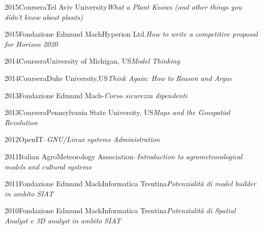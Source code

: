 \documentclass{curriculum}
\begin{document}
    \begin{entrylist}
    \entry
        {2015}{Coursera}{Tel Aviv University}{\emph{What a Plant Knows (and other things you didn’t know about plants)}}
    \end{entrylist}

    \begin{entrylist}
    \entry
        {2015}{Fondazione Edmund Mach}{Hyperion Ltd.}{\emph{How to write a competitive proposal for Horizon 2020}}
    \end{entrylist}
    
    \begin{entrylist}
    \entry
        {2014}{Coursera}{University of Michigan, US}{\emph{Model Thinking}}
    \end{entrylist}
    \begin{entrylist}
    \entry
        {2014}{Coursera}{Duke University,US}{\emph{Think Again: How to Reason and Argue}}
    \end{entrylist}
    
    \begin{entrylist}
    \entry
        {2013}{Fondazione Edmund Mach}{-}{\emph{Corso sicurezza dipendenti}}
    \end{entrylist}
    
    \begin{entrylist}
    \entry
        {2013}{Coursera}{Pennsylvania State University, US}{\emph{Maps and the Geospatial Revolution}}
    \end{entrylist}
    
    \begin{entrylist}
    \entry
        {2012}{OpenIT}{--}{\emph{GNU/Linux systems Administration}}
    \end{entrylist}
    
    \begin{entrylist}
    \entry
        {2011}{Italian AgroMeteorology Association}{--}{\emph{Introduction to agrometeorological models and cultural systems}}
    \end{entrylist}
    
    \begin{entrylist}
    \entry
        {2011}{Fondazione Edmund Mach}{Informatica Trentina}{\emph{Potenzialità di model builder in ambito SIAT}}
    \end{entrylist}   
    
    \begin{entrylist}
    \entry
        {2010}{Fondazione Edmund Mach}{Informatica Trentina}{\emph{Potenzialità di Spatial Analyst e 3D analyst in ambito SIAT}}
    \end{entrylist} 
    
\end{document}
